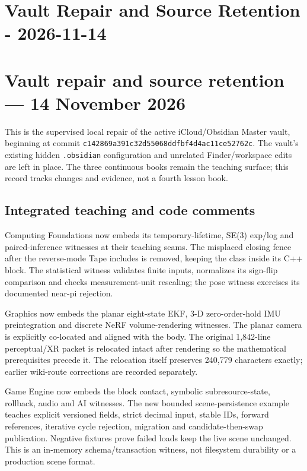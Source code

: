 \hypertarget{appendix-faa2b5a8e820}{}
\section*{Vault Repair and Source Retention - 2026-11-14}
\section{Vault repair and source retention --- 14 November 2026}\label{appendix-faa2b5a8e820-vault-repair-and-source-retention-14-november-2026}

This is the supervised local repair of the active iCloud/Obsidian Master vault, beginning at commit \texttt{c142869a391c32d55068ddfbf4d4ac11ce52762c}. The vault's existing hidden \texttt{.obsidian} configuration and unrelated Finder/workspace edits are left in place. The three continuous books remain the teaching surface; this record tracks changes and evidence, not a fourth lesson book.

\subsection{Integrated teaching and code comments}\label{appendix-faa2b5a8e820-integrated-teaching-and-code-comments}

Computing Foundations now embeds its temporary-lifetime, SE(3) exp/log and paired-inference witnesses at their teaching seams. The misplaced closing fence after the reverse-mode Tape includes is removed, keeping the class inside its C++ block. The statistical witness validates finite inputs, normalizes its sign-flip comparison and checks measurement-unit rescaling; the pose witness exercises its documented near-pi rejection.

Graphics now embeds the planar eight-state EKF, 3-D zero-order-hold IMU preintegration and discrete NeRF volume-rendering witnesses. The planar camera is explicitly co-located and aligned with the body. The original 1,842-line perceptual/XR packet is relocated intact after rendering so the mathematical prerequisites precede it. The relocation itself preserves 240,779 characters exactly; earlier wiki-route corrections are recorded separately.

Game Engine now embeds the block contact, symbolic subresource-state, rollback, audio and AI witnesses. The new bounded scene-persistence example teaches explicit versioned fields, strict decimal input, stable IDs, forward references, iterative cycle rejection, migration and candidate-then-swap publication. Negative fixtures prove failed loads keep the live scene unchanged. This is an in-memory schema/transaction witness, not filesystem durability or a production scene format.

